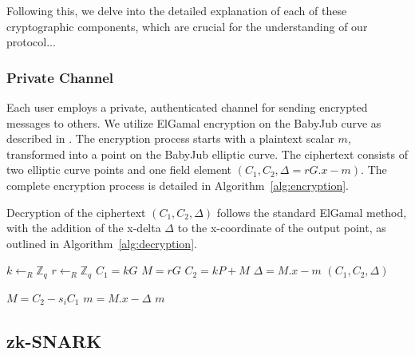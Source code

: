 \documentclass[runningheads]{llncs}
\begin{document}
Following this, we delve into the detailed explanation of each of these cryptographic components, which are crucial for the understanding of our protocol...



\subsubsection{Private Channel}
Each user employs a private, authenticated channel for sending encrypted messages to others. We utilize ElGamal encryption on the BabyJub curve as described in \cite{ElGamalEncryptionDecryption2020,jieWeijiekohElgamalbabyjub2023}. The encryption process starts with a plaintext scalar $m$, transformed into a point on the BabyJub elliptic curve. The ciphertext consists of two elliptic curve points and one field element $(C_1, C_2, \Delta=rG.x - m)$. The complete encryption process is detailed in Algorithm~\ref{alg:encryption}.

Decryption of the ciphertext $(C_1, C_2, \Delta)$ follows the standard ElGamal method, with the addition of the x-delta $\Delta$ to the x-coordinate of the output point, as outlined in Algorithm~\ref{alg:decryption}.

\begin{algorithm}
    \caption{$\texttt{Enc}_{P_i}$}
    \label{alg:encryption}
    
    
    $k \gets_R \mathbb{Z}_q$\;
    $r \gets_R \mathbb{Z}_q$\;
    $C_1 = kG$\;
    $M = rG$\;
    $C_2 = kP + M$\;
    $\Delta = M.x - m$\;
    \Return $(C_1, C_2, \Delta)$
\end{algorithm}

\begin{algorithm}
    \caption{$\texttt{Dec}_{s_i}$}
    \label{alg:decryption}
    
    
    $M = C_2 - s_i C_1$\;
    $m = M.x - \Delta$\;
    \Return $m$
\end{algorithm}




\subsection{zk-SNARK}
\end{document}
